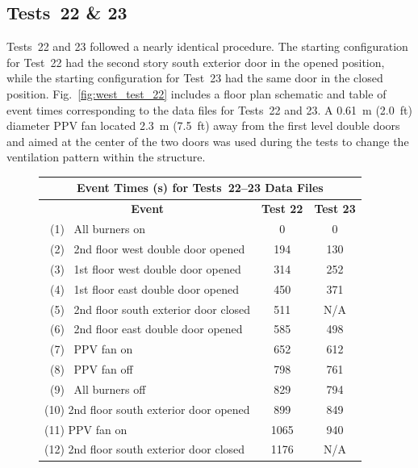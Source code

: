 \documentclass[12pt,oneside]{book}
\begin{document}
\subsection{Tests~22 \& 23}
Tests~22 and 23 followed a nearly identical procedure. The starting configuration for Test~22 had the second story south exterior door in the opened position, while the starting configuration for Test~23 had the same door in the closed position. Fig.~\ref{fig:west_test_22} includes a floor plan schematic and table of event times corresponding to the data files for Tests~22 and 23. A 0.61~m (2.0~ft) diameter PPV fan located 2.3~m (7.5~ft) away from the first level double doors and aimed at the center of the two doors was used during the tests to change the ventilation pattern within the structure.
\begin{figure}[!ht]
\begin{minipage}[b]{0.8\columnwidth}
	\begin{flushleft}
	\begin{tabular}{lcc}
	\multicolumn{3}{c}{Event Times (s) for Tests~22--23 Data Files} \\
	\toprule
	\multicolumn{1}{c}{\textbf{Event}} 			& \textbf{Test 22}	& \textbf{Test 23} \\
	\midrule
	~(1)~  All burners on 						&   0	  			&	 0			\\
	~(2)~  2nd floor west double door opened 	&   194		  		&    130		\\
	~(3)~  1st floor west double door opened 	&	314		  		&    252 	 	\\
	~(4)~  1st floor east double door opened 	&   450			  	&    371		\\
	~(5)~  2nd floor south exterior door closed &   511		  		&    N/A		\\
	~(6)~  2nd floor east double door opened	&   585			  	&    498		\\
	~(7)~  PPV fan on 							&   652			  	&    612		\\
	~(8)~  PPV fan off              			&   798			  	&    761		\\
	~(9)~  All burners off 						&   829			  	&    794		\\
	(10)   2nd floor south exterior door opened &   899			  	&    849		\\
	(11)   PPV fan on 	 						&   1065		  	&    940		\\
	(12)   2nd floor south exterior door closed &   1176		  	&    N/A		\\
	\bottomrule
	\end{tabular}

\end{flushleft}
\end{minipage}
\end{figure}
\end{document}
